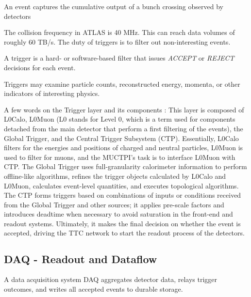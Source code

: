 \begin{definition}
\label{def:event}
An event captures the cumulative output of a bunch crossing observed by detectors
\end{definition}

The collision frequency in \acs{ATLAS} is 40 MHz. This can reach data volumes of roughly 60 TB/s. The duty of triggers is to filter out non-interesting events.

\begin{definition}
\label{def:trigger}
A trigger is a hard- or software-based filter that issues \emph{ACCEPT} or \emph{REJECT} decisions for each event.
\end{definition}

Triggers may examine particle counts, reconstructed energy, momenta, or other indicators of interesting physics.

A few words on the Trigger layer and its components \cite{tdaq}:
This layer is composed of \acs{L0Calo}, \acs{L0Muon} (\acs{L0} stands for Level 0, which is a term used for components detached from the main detector that perform a first filtering of the events), the Global Trigger, and the Central Trigger Subsystem (\acs{CTP}). Essentially, \acs{L0Calo} filters for the energies and positions of charged and neutral particles, \acs{L0Muon} is used to filter for muons, and the \acs{MUCTPI}'s task is to interface \acs{L0Muon} with \acs{CTP}. The Global Trigger \cite{tdaq} uses full-granularity calorimeter information to perform offline-like algorithms, refines the trigger objects calculated by \acs{L0Calo} and \acs{L0Muon}, calculates event-level quantities, and executes topological algorithms. The \acs{CTP} \cite{tdaq} forms triggers based on combinations of inputs or conditions received from the Global Trigger and other sources; it applies pre-scale factors and introduces deadtime when necessary to avoid saturation in the front-end and readout systems. Ultimately, it makes the final decision on whether the event is accepted, driving the \acs{TTC} network to start the readout process of the detectors.

\subsection{\acs{DAQ} - Readout and Dataflow}

\begin{definition}
\label{def:daq}
A data acquisition system \acs{DAQ} aggregates detector data, relays trigger outcomes, and writes all accepted events to durable storage.
\end{definition}

